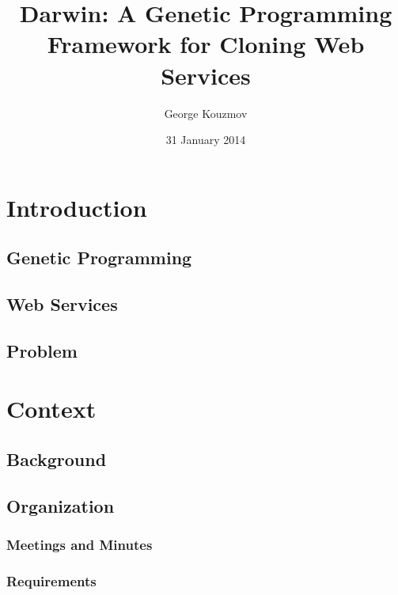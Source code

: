 \documentclass{l4proj}
\begin{document}
\title{Darwin: A Genetic Programming Framework for Cloning Web Services}
\author{George Kouzmov}
\date{31 January 2014}
\maketitle

\tableofcontents
\chapter{Introduction}


\section{Genetic Programming}


\section{Web Services}


\section{Problem}


\chapter{Context}

\section{Background}


\section{Organization}


\subsection{Meetings and Minutes}

\subsection{Requirements}

\end{document}
